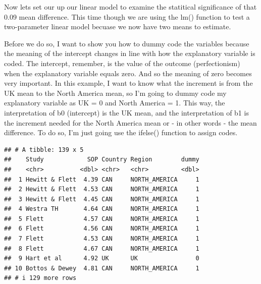\documentclass[
]{article}
\newenvironment{Shaded}{\begin{snugshade}}{\end{snugshade}}
\newcommand{\CommentTok}[1]{\textcolor[rgb]{0.56,0.35,0.01}{\textit{#1}}}
\newcommand{\DecValTok}[1]{\textcolor[rgb]{0.00,0.00,0.81}{#1}}
\newcommand{\FunctionTok}[1]{\textcolor[rgb]{0.13,0.29,0.53}{\textbf{#1}}}
\newcommand{\NormalTok}[1]{#1}
\newcommand{\OtherTok}[1]{\textcolor[rgb]{0.56,0.35,0.01}{#1}}
\newcommand{\SpecialCharTok}[1]{\textcolor[rgb]{0.81,0.36,0.00}{\textbf{#1}}}
\newcommand{\StringTok}[1]{\textcolor[rgb]{0.31,0.60,0.02}{#1}}
\begin{document}
Now lets set our up our linear model to examine the statitical
significance of that 0.09 mean difference. This time though we are using
the lm() function to test a two-parameter linear model becuase we now
have two means to estimate.

Before we do so, I want to show you how to dummy code the variables
because the meaning of the intercept changes in line with how the
explanatory variable is coded. The intercept, remember, is the value of
the outcome (perfectionism) when the explanatory variable equals zero.
And so the meaning of zero becomes very important. In this example, I
want to know what the increment is from the UK mean to the North America
mean, so I'm going to dummy code my explanatory variable as UK = 0 and
North America = 1. This way, the interpretation of b0 (intercept) is the
UK mean, and the interpretation of b1 is the increment needed for the
North America mean or - in other words - the mean difference. To do so,
I'm just going use the ifelse() function to assign codes.

\begin{Shaded}
\end{Shaded}

\begin{verbatim}
## # A tibble: 139 x 5
##    Study            SOP Country Region        dummy
##    <chr>          <dbl> <chr>   <chr>         <dbl>
##  1 Hewitt & Flett  4.39 CAN     NORTH_AMERICA     1
##  2 Hewitt & Flett  4.53 CAN     NORTH_AMERICA     1
##  3 Hewitt & Flett  4.45 CAN     NORTH_AMERICA     1
##  4 Westra TH       4.64 CAN     NORTH_AMERICA     1
##  5 Flett           4.57 CAN     NORTH_AMERICA     1
##  6 Flett           4.56 CAN     NORTH_AMERICA     1
##  7 Flett           4.53 CAN     NORTH_AMERICA     1
##  8 Flett           4.67 CAN     NORTH_AMERICA     1
##  9 Hart et al      4.92 UK      UK                0
## 10 Bottos & Dewey  4.81 CAN     NORTH_AMERICA     1
## # i 129 more rows
\end{verbatim}
\end{document}

